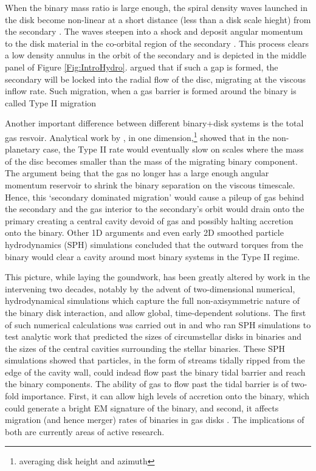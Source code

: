 When the binary mass ratio is large enough, the spiral density waves launched
in the disk become non-linear at a short distance (less than a disk scale
hieght) from the secondary \citep{GoodmanRafikov:2001}. The waves steepen into
a shock and deposit angular momentum to the disk material in the co-orbital
region of the secondary \citep[see Chapter \ref{ch:CBDTrans} and also][]{DongRafI:2011, DongRafII:2011, LinPapaI:1984,LinPapa86b,
LinPapaIII:1986}. This process clears a low density annulus in the orbit of
the secondary and is depicted in the middle panel of Figure
\ref{Fig:IntroHydro}. \cite{LinPapa86b} argued that if
such a gap is formed, the secondary will be locked into the radial flow of the
disc, migrating at the viscous inflow rate. Such migration, when a gas barrier
is formed around the binary is called Type II migration \citep[see also][and Chapter \ref{ch:CBDTrans}]{Ward:1997, KleyNelson:2012:rev, othertypeIIrefs}



Another important difference between different binary+disk systems is the
total gas resvoir. Analytical work by \citep{SyerClarke95, Ivanov99}, in
one dimension,\footnote{averaging disk height and azimuth} showed that in the
non-planetary case, the Type II rate would eventually slow on scales where the
mass of the disc becomes smaller than the mass of the migrating binary
component. The argument being that the gas no longer has a large enough angular
momentum reservoir to shrink the binary separation on the viscous
timescale. Hence, this `secondary dominated migration' would cause a pileup of
gas behind the secondary and the gas interior to the secondary's orbit would
drain onto the primary creating a central cavity devoid of gas and possibly
halting accretion onto the binary. Other 1D arguments
\citep[][]{Milos:Phinney:2005} and even early 2D smoothed particle hydrodynamics
(SPH) simulations \citep{Artymowicz:1991} concluded that the outward torques
from the binary would clear a cavity around most binary systems in the Type II
regime.


This picture, while laying the goundwork, has been greatly altered by work in
the intervening two decades, notably by the advent of two-dimensional
numerical, hydrodynamical simulations which capture the full non-axisymmetric
nature of the binary disk interaction, and allow global, time-dependent
solutions. The first of such numerical calculations was carried out in
\cite{AL94} and \cite{ArtyLubow:1996} who ran SPH simulations to
test analytic work that predicted the sizes of circumstellar disks in binaries
and the sizes of the central cavities surrounding the stellar binaries. These
SPH simulations showed that particles, in the form of streams tidally ripped
from the edge of the cavity wall, could indead flow past the binary tidal
barrier and reach the binary components. The ability of gas to flow past the
tidal barrier is of two-fold importance. First, it can allow high levels of
accretion onto the binary, which could generate a bright EM signature of the
binary, and second, it affects migration (and hence merger) rates of binaries
in gas disks \citep{DuffellFTV:2014}. The implications of both are currently areas
of active research. 




